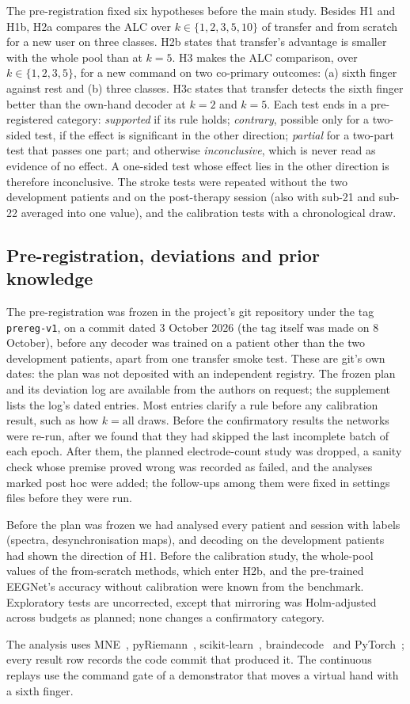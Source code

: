 The pre-registration fixed six hypotheses before the main study. Besides H1
and H1b, H2a compares the ALC over $k \in \{1, 2, 3, 5, 10\}$ of transfer and
from scratch for a new user on three classes. H2b states that transfer's
advantage is smaller with the whole pool than at $k = 5$. H3 makes the ALC
comparison, over $k \in \{1, 2, 3, 5\}$, for a new command on two co-primary
outcomes: (a) sixth finger against rest and (b) three classes. H3c states
that transfer detects the sixth finger better than the own-hand decoder at
$k = 2$ and $k = 5$. Each test ends in a pre-registered category:
\emph{supported} if its rule holds; \emph{contrary}, possible only for a
two-sided test, if the effect is significant in the other direction;
\emph{partial} for a two-part test that passes one part; and otherwise
\emph{inconclusive}, which is never read as evidence of no effect. A
one-sided test whose effect lies in the other direction is therefore
inconclusive. The stroke tests were repeated without the two development
patients and on the post-therapy session (also with sub-21 and sub-22
averaged into one value), and the calibration tests with a chronological
draw.

\subsection{Pre-registration, deviations and prior knowledge}
\label{sec:prereg}
The pre-registration was frozen in the project's git repository under the
tag \texttt{prereg-v1}, on a commit dated 3 October 2026 (the tag itself was
made on 8 October), before any decoder was trained on a patient other than
the two development patients, apart from one transfer smoke test. These are git's own dates: the plan was not
deposited with an independent registry. The frozen plan and its deviation
log are available from the authors on request; the supplement lists the
log's \nDeviations{} dated entries.
Most entries clarify a rule before any calibration result, such as how
$k = \text{all}$ draws. Before the confirmatory results the networks were
re-run, after we found that they had skipped the last incomplete batch of
each epoch. After them, the planned electrode-count study was dropped, a
sanity check whose premise proved wrong was recorded as failed, and the
analyses marked post hoc were added; the follow-ups among them were fixed in
settings files before they were run.

Before the plan was frozen we had analysed every patient and session with
labels (spectra, desynchronisation maps), and decoding on the development
patients had shown the direction of H1. Before the calibration study, the
whole-pool values of the from-scratch methods, which enter H2b, and the
pre-trained EEGNet's accuracy without calibration were known from the
benchmark. Exploratory tests are uncorrected, except that mirroring was
Holm-adjusted across budgets as planned; none changes a confirmatory
category.

The analysis uses MNE~\cite{gramfort2013}, pyRiemann~\cite{pyriemann},
scikit-learn~\cite{pedregosa2011}, braindecode~\cite{braindecode} and
PyTorch~\cite{paszke2019}; every result row records the code commit that
produced it. The continuous replays use the command gate of a demonstrator
that moves a virtual hand with a sixth finger.

